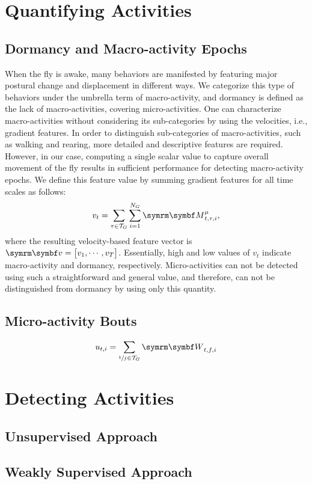 
\section{Quantifying Activities}
\subsection{Dormancy and Macro-activity Epochs}
When the fly is awake, many behaviors are manifested by featuring major postural change and displacement in different ways.
We categorize this type of behaviors under the umbrella term of macro-activity, and dormancy is defined as the lack of macro-activities, covering micro-activities.
One can characterize macro-activities without considering its sub-categories by using the velocities, i.e., gradient features.
In order to distinguish sub-categories of macro-activities, such as walking and rearing, more detailed and descriptive features are required.
However, in our case, computing a single scalar value to capture overall movement of the fly results in sufficient performance for detecting macro-activity epochs. We define this feature value by summing gradient features for all time scales as follows:
\begin{equation}
	v_t = \sum_{\tau \in \mathcal{T}_G}{\sum_{i=1}^{N_G}{\V{M}^\mu_{t,\tau,i}}},
\end{equation}
where the resulting velocity-based feature vector is $\V{v}=\qmatrix{v_1, \cdots, v_T}$. Essentially, high and low values of $v_t$ indicate macro-activity and dormancy, respectively. Micro-activities can not be detected using such a straightforward and general value, and therefore, can not be distinguished from dormancy by using only this quantity.

\subsection{Micro-activity Bouts}

\begin{equation}
	u_{t,i} = \sum_{\sfrac{1}{f} \in \mathcal{T}_G}{\V{W}_{t,f,i}}
\end{equation}

\section{Detecting Activities}

\subsection{Unsupervised Approach}

\subsection{Weakly Supervised Approach}
